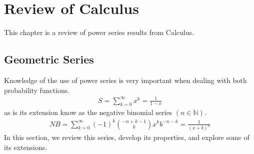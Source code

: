 \documentclass[10pt,]{book}
\numberwithin{equation}{section}
\begin{document}
\chapter[{Review of Calculus}]{Review of Calculus}\label{PowerSeriesReview}
\hypertarget{p-1206}{}%
This chapter is a review of power series results from Calculus.%
%
%
\typeout{************************************************}
\typeout{************************************************}
%
\section[{Geometric Series}]{Geometric Series}\label{section-79}
\hypertarget{p-1207}{}%
Knowledge of the use of power series is very important when dealing with both probability functions.%
%
\begin{gather*}
S = \sum_{k=0}^{\infty} {x^k} = \frac{1}{1-x}
\end{gather*}
\hypertarget{p-1208}{}%
as is its extension know as the negative binomial series \(( n \in \mathbb{N} )\).%
%
\begin{gather*}
NB = \sum_{k=0}^{\infty} (-1)^k \binom{-n + k - 1}{k} {x^k b^{-n-k}} = \frac{1}{(x+b)^n}
\end{gather*}
\hypertarget{p-1209}{}%
In this section, we review this series, develop its properties, and explore some of its extensions.%
%
%
\typeout{************************************************}
\typeout{************************************************}
%
\end{document}
